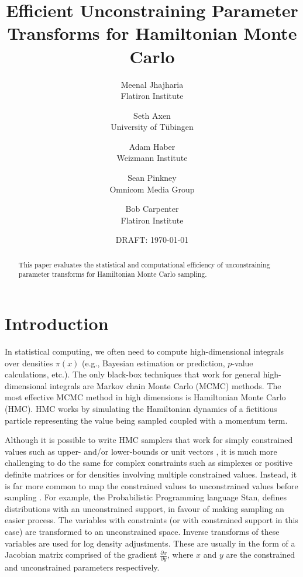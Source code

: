 \documentclass[11pt]{article}
\begin{document}
\title{Efficient Unconstraining
  Parameter Transforms for Hamiltonian Monte Carlo}
\author{Meenal Jhajharia \\ \small Flatiron Institute 
\and Seth Axen \\ \small University of T\"ubingen 
\and Adam Haber \\ \small Weizmann Institute 
\and Sean Pinkney \\ \small Omnicom Media Group
\and Bob Carpenter \\ \small Flatiron Institute}
\date{DRAFT: \today}
\maketitle


\begin{abstract}
  \noindent
  This paper evaluates the statistical and computational
  efficiency of unconstraining parameter transforms for Hamiltonian
  Monte Carlo sampling.
\end{abstract}

\section{Introduction}

In statistical computing, we often need to compute high-dimensional
integrals over densities $\pi(x)$ (e.g., Bayesian estimation or
prediction, $p$-value calculations, etc.).  The only black-box
techniques that work for general high-dimensional integrals are
Markov chain Monte Carlo (MCMC) methods.  The most effective MCMC
method in high dimensions is Hamiltonian Monte Carlo (HMC).  HMC works
by simulating the Hamiltonian dynamics of a fictitious particle
representing the value being sampled coupled with a momentum term.

Although it is possible to write HMC samplers that work for simply
constrained values such as upper- and/or lower-bounds
\cite{neal2011mcmc} or unit vectors \cite{byrne2013geodesic}, it is
much more challenging to do the same for complex constraints such as
simplexes or positive definite matrices or for densities involving
multiple constrained values.  Instead, it is far more common to map
the constrained values to unconstrained values before sampling
\cite{JSSv076i01}.  For example, the Probabilistic  Programming language Stan, defines distributions with an unconstrained support, in favour of making sampling an easier process. The variables with constraints (or with constrained support in this case) are transformed to an unconstrained space. Inverse transforms of these variables are used for log density adjustments. These are usually in the form of a Jacobian matrix comprised of the gradient $\frac{\partial x}{\partial y}$, where $x$ and $y$ are the constrained and unconstrained parameters respectively.
\end{document}
